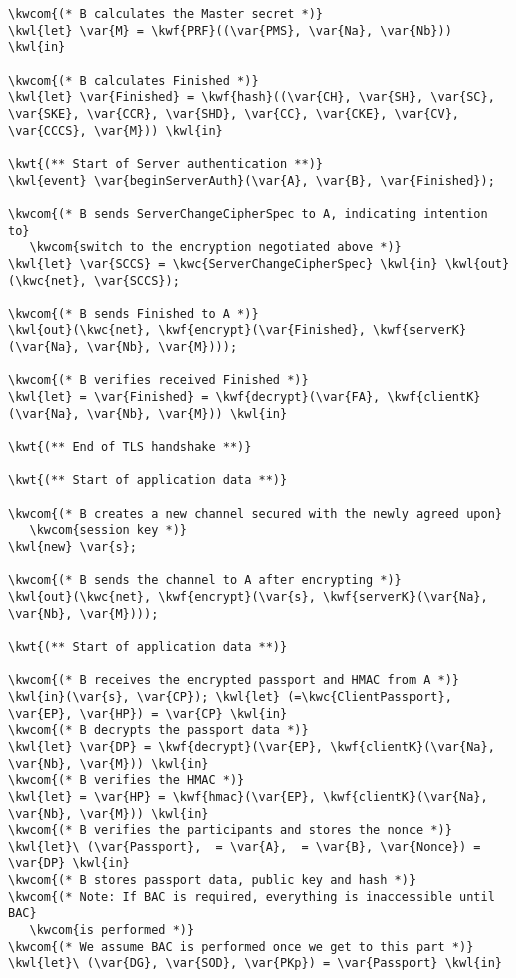 \begin{Verbatim}[commandchars=\\\{\},codes={\catcode`$=3}]
\kwcom{(* B calculates the Master secret *)}
\kwl{let} \var{M} = \kwf{PRF}((\var{PMS}, \var{Na}, \var{Nb})) \kwl{in}

\kwcom{(* B calculates Finished *)}
\kwl{let} \var{Finished} = \kwf{hash}((\var{CH}, \var{SH}, \var{SC}, \var{SKE}, \var{CCR}, \var{SHD}, \var{CC}, \var{CKE}, \var{CV},
\var{CCCS}, \var{M})) \kwl{in}

\kwt{(** Start of Server authentication **)}
\kwl{event} \var{beginServerAuth}(\var{A}, \var{B}, \var{Finished});

\kwcom{(* B sends ServerChangeCipherSpec to A, indicating intention to}
   \kwcom{switch to the encryption negotiated above *)}
\kwl{let} \var{SCCS} = \kwc{ServerChangeCipherSpec} \kwl{in} \kwl{out}(\kwc{net}, \var{SCCS});

\kwcom{(* B sends Finished to A *)}
\kwl{out}(\kwc{net}, \kwf{encrypt}(\var{Finished}, \kwf{serverK}(\var{Na}, \var{Nb}, \var{M})));

\kwcom{(* B verifies received Finished *)}
\kwl{let} = \var{Finished} = \kwf{decrypt}(\var{FA}, \kwf{clientK}(\var{Na}, \var{Nb}, \var{M})) \kwl{in}

\kwt{(** End of TLS handshake **)}

\kwt{(** Start of application data **)}

\kwcom{(* B creates a new channel secured with the newly agreed upon}
   \kwcom{session key *)}
\kwl{new} \var{s};

\kwcom{(* B sends the channel to A after encrypting *)}
\kwl{out}(\kwc{net}, \kwf{encrypt}(\var{s}, \kwf{serverK}(\var{Na}, \var{Nb}, \var{M})));

\kwt{(** Start of application data **)}

\kwcom{(* B receives the encrypted passport and HMAC from A *)}
\kwl{in}(\var{s}, \var{CP}); \kwl{let} (=\kwc{ClientPassport}, \var{EP}, \var{HP}) = \var{CP} \kwl{in}
\kwcom{(* B decrypts the passport data *)}
\kwl{let} \var{DP} = \kwf{decrypt}(\var{EP}, \kwf{clientK}(\var{Na}, \var{Nb}, \var{M})) \kwl{in}
\kwcom{(* B verifies the HMAC *)}
\kwl{let} = \var{HP} = \kwf{hmac}(\var{EP}, \kwf{clientK}(\var{Na}, \var{Nb}, \var{M})) \kwl{in}
\kwcom{(* B verifies the participants and stores the nonce *)}
\kwl{let}\ (\var{Passport},  = \var{A},  = \var{B}, \var{Nonce}) = \var{DP} \kwl{in}
\kwcom{(* B stores passport data, public key and hash *)}
\kwcom{(* Note: If BAC is required, everything is inaccessible until BAC}
   \kwcom{is performed *)}
\kwcom{(* We assume BAC is performed once we get to this part *)}
\kwl{let}\ (\var{DG}, \var{SOD}, \var{PKp}) = \var{Passport} \kwl{in}


\end{Verbatim}
